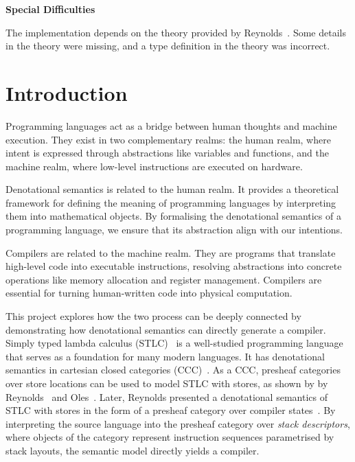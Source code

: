 \documentclass[12pt,a4paper]{report}
\makeatletter
\theoremstyle{definition}
\newcommand{\frontmatter}{
  \pagenumbering{roman}
}
\newcommand{\mainmatter}{
  \cleardoublepage
  \pagenumbering{arabic}
  \setcounter{page}{1}
}
\newcommand{\chapterminitoc}{%
  \begingroup
    \let\ps@plain\ps@empty %
    \let\ps@headings\ps@empty
    \minitoc
    \thispagestyle{empty} %
    \afterpage{\clearpage} %
  \endgroup
    \clearpage
  \addtocounter{page}{-1} %
}
\makeatother
\begin{document}
\begin{titlepage}
    \vspace{2em}
    \textbf{\Large Special Difficulties}
    \vspace{1em}
    
    The implementation depends on the theory provided by Reynolds~\autocite{Reynolds}. Some details in the theory were missing, and a type definition in the theory was incorrect.


    \begingroup
    \endgroup
\end{titlepage}

\frontmatter
\tableofcontents
\newpage

\mainmatter
\chapter{Introduction}
    \chapterminitoc
    Programming languages act as a bridge between human thoughts and machine execution. They exist in two complementary realms: the human realm, where intent is expressed through abstractions like variables and functions, and the machine realm, where low-level instructions are executed on hardware. 

    Denotational semantics is related to the human realm. It provides a theoretical framework for defining the meaning of programming languages by interpreting them into mathematical objects. By formalising the denotational semantics of a programming language, we ensure that its abstraction align with our intentions.

    Compilers are related to the machine realm. They are programs that translate high-level code into executable instructions, resolving abstractions into concrete operations like memory allocation and register management. Compilers are essential for turning human-written code into physical computation.

    This project explores how the two process can be deeply connected by demonstrating how denotational semantics can directly generate a compiler. Simply typed lambda calculus (STLC)~\autocite{stlc} is a well-studied programming language that serves as a foundation for many modern languages. It has denotational semantics in cartesian closed categories (CCC)~\autocite{lambek}. As a CCC, presheaf categories over store locations can be used to model STLC with stores, as shown by by Reynolds~\autocite{essence} and Oles~\autocite{Oles_1,Oles_2}. Later, Reynolds presented a denotational semantics of STLC with stores in the form of a presheaf category over compiler states~\autocite{Reynolds}. By interpreting the source language into the presheaf category over \emph{stack descriptors}, where objects of the category represent instruction sequences parametrised by stack layouts, the semantic model directly yields a compiler. 
    
\end{document}
